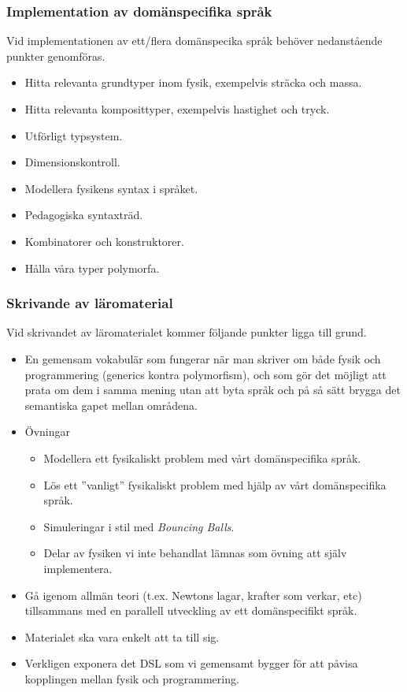 \documentclass[12pt,a4paper]{article}
\begin{document}
\subsubsection*{Implementation av domänspecifika språk}

Vid implementationen av ett/flera domänspecika språk behöver nedanstående punkter genomföras.

\begin{itemize}
    \item Hitta relevanta grundtyper inom fysik, exempelvis sträcka och massa.
    \item Hitta relevanta komposittyper, exempelvis hastighet och tryck.
    \item Utförligt typsystem.
    \item Dimensionskontroll.
    \item Modellera fysikens syntax i språket.
    \item Pedagogiska syntaxträd.
    \item Kombinatorer och konstruktorer.
    \item Hålla våra typer polymorfa.
\end{itemize}

\subsubsection*{Skrivande av läromaterial}

Vid skrivandet av läromaterialet kommer följande punkter ligga till grund.

\begin{itemize}
    \item En gemensam vokabulär som fungerar när man skriver om både
      fysik och programmering (generics kontra polymorfism), och som gör det
      möjligt att prata om dem i samma mening utan att byta språk och på så sätt
      brygga det semantiska gapet mellan områdena.  
    \item Övningar
        \begin{itemize}
            \item Modellera ett fysikaliskt problem med vårt domänspecifika språk.
            \item Lös ett ''vanligt'' fysikaliskt problem med hjälp av vårt domänspecifika språk.
            \item Simuleringar i stil med \textit{Bouncing Balls}.
            \item Delar av fysiken vi inte behandlat lämnas som övning att själv implementera.
        \end{itemize}
    \item Gå igenom allmän teori (t.ex. Newtons lagar, krafter som verkar, etc) tillsammans med en parallell utveckling av ett domänspecifikt språk.
    \item Materialet ska vara enkelt att ta till sig.
    \item Verkligen exponera det DSL som vi gemensamt bygger för att påvisa kopplingen mellan fysik och programmering.
\end{itemize}
\end{document}
